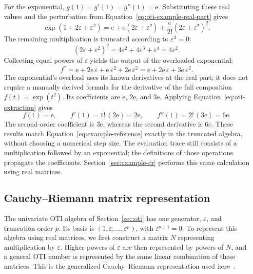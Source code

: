 \documentclass[10pt]{article}
\begin{document}
For the exponential, $g(1)=g'(1)=g''(1)=\mathrm e$. Substituting these real
values and the perturbation from Equation~\eqref{eq:oti-example-real-part} gives
\[
 \exp(1+2\varepsilon+\varepsilon^2)=\mathrm e+\mathrm e(2\varepsilon+\varepsilon^2)
       +\frac{\mathrm e}{2!}(2\varepsilon+\varepsilon^2)^2.
\]
The remaining multiplication is truncated according to $\varepsilon^3=0$:
\[
 (2\varepsilon+\varepsilon^2)^2
 =4\varepsilon^2+4\varepsilon^3+\varepsilon^4=4\varepsilon^2.
\]
Collecting equal powers of $\varepsilon$ yields the output of the overloaded
exponential:
\begin{equation}
\label{eq:example-oti}
 f^*=\mathrm e+2\mathrm e\,\varepsilon
       +\mathrm e\,\varepsilon^2+2\mathrm e\,\varepsilon^2
       =\mathrm e+2\mathrm e\,\varepsilon+3\mathrm e\,\varepsilon^2.
\end{equation}
The exponential's overload uses its known derivatives at the real part; it does
not require a manually derived formula for the derivative of the full
composition $f(t)=\exp(t^2)$.
Its coefficients are $\mathrm e$, $2\mathrm e$, and $3\mathrm e$.
Applying Equation~\eqref{eq:oti-extraction} gives
\[
 f(1)=\mathrm e,\qquad
 f'(1)=1!\,(2\mathrm e)=2\mathrm e,\qquad
 f''(1)=2!\,(3\mathrm e)=6\mathrm e.
\]
The second-order coefficient is $3\mathrm e$, whereas the second derivative is
$6\mathrm e$. These results match Equation~\eqref{eq:example-reference} exactly
in the truncated algebra, without choosing a numerical step size.
The evaluation trace still consists of a multiplication followed by an
exponential; the definitions of those operations propagate the coefficients.
Section~\ref{sec:example-cr} performs this same calculation using real matrices.

\subsection{Cauchy--Riemann matrix representation}
\label{sec:cr}
The univariate OTI algebra of Section~\ref{sec:oti} has one generator,
$\varepsilon$, and truncation order $p$. Its basis is
$(1,\varepsilon,\ldots,\varepsilon^p)$, with
$\varepsilon^{p+1}=0$. To represent this algebra using real matrices, we
first construct a matrix $N$ representing multiplication by $\varepsilon$.
Higher powers of $\varepsilon$ are then represented by powers of $N$, and
a general OTI number is represented by the same linear combination of these
matrices. This is the generalized Cauchy--Riemann representation used
here~\cite{aristizabal2020}.
\end{document}
